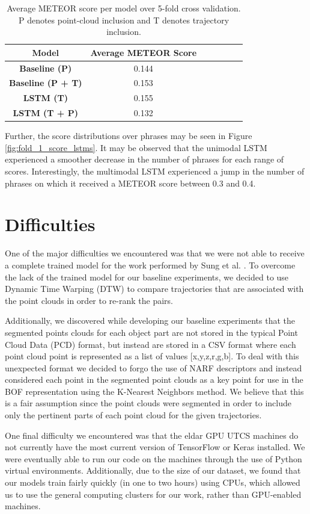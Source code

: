 \documentclass[letterpaper, 12 pt, conference]{ieeeconf}
\begin{document}
\begin{table}[h]
\center
\begin{tabular}{|c|c|c|c|c|c|c|}
\hline
\textbf{Model} & \textbf{Average METEOR Score} \\
\hline
\textbf{Baseline (P)} & 0.144 \\
\hline
\textbf{Baseline (P + T)} & 0.153 \\
\hline
\textbf{LSTM (T)} & 0.155 \\
\hline
\textbf{LSTM (T + P)} & 0.132 \\
\hline
\end{tabular}
\caption{Average METEOR score per model over 5-fold cross validation. P denotes point-cloud inclusion and T denotes trajectory inclusion.}\label{fig:score_table}
\end{table}

Further, the score distributions over phrases may be seen in Figure \ref{fig:fold_1_score_lstms}. It may be observed that the unimodal LSTM experienced a smoother decrease in the number of phrases for each range of scores. Interestingly, the multimodal LSTM experienced a jump in the number of phrases on which it received a METEOR score between 0.3 and 0.4. 

\section{Difficulties}\label{Difficulties}

One of the major difficulties we encountered was that we were not able to receive a complete trained model for the work performed by Sung et al. \cite{sung2016robobarista}. To overcome the lack of the trained model for our baseline experiments, we decided to use Dynamic Time Warping (DTW) to compare trajectories that are associated with the point clouds in order to re-rank the pairs.

Additionally, we discovered while developing our baseline experiments that the segmented points clouds for each object part are not stored in the typical Point Cloud Data (PCD) format, but instead are stored in a CSV format where each point cloud point is represented as a list of values [x,y,z,r,g,b]. To deal with this unexpected format we decided to forgo the use of NARF \cite{steder2010narf} descriptors and instead considered each point in the segmented point clouds as a key point for use in the BOF representation using the K-Nearest Neighbors method. We believe that this is a fair assumption since the point clouds were segmented in order to include only the pertinent parts of each point cloud for the given trajectories. 
\par
One final difficulty we encountered was that the eldar GPU UTCS machines do not currently have the most current version of TensorFlow or Keras installed. We were eventually able to run our code on the machines through the use of Python virtual environments. Additionally, due to the size of our dataset, we found that our models train fairly quickly (in one to two hours) using CPUs, which allowed us to use the general computing clusters for our work, rather than GPU-enabled machines. 
\end{document}

